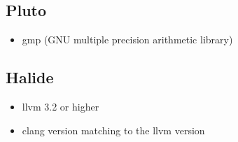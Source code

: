 \documentclass[AEJ]{AEA}
\begin{document}
\subsection{Pluto}

\begin{itemize}
	\item gmp (GNU multiple precision arithmetic library)
\end{itemize}

\subsection{Halide}

\begin{itemize}
	\item llvm 3.2 or higher
	\item clang version matching to the llvm version
\end{itemize}
\end{document}

